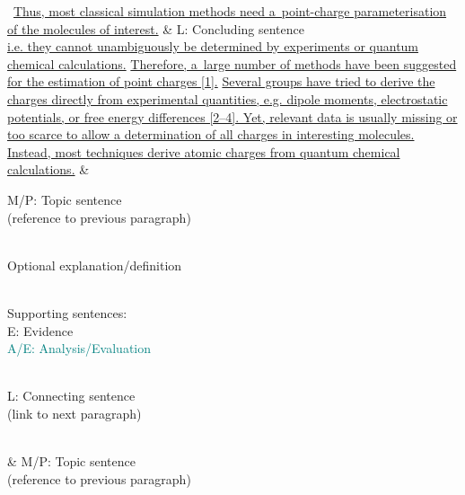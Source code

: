 \begingroup
	\begin{longtblr}{}
		\textellipsis\ {\ul{Thus, most classical simulation methods need a~point-charge parameterisation of the molecules of interest.}}
		&
		\textcolor{DarkOrchid3}{L: Concluding sentence}
		\\
		{\ul{i.e. they cannot unambiguously be determined by experiments or quantum chemical calculations.}}
		{\ul{Therefore, a~large number of methods have been suggested for the estimation of point charges [1].}}
		{\ul{Several groups have tried to derive the charges directly from experimental quantities, e.g. dipole moments, electrostatic potentials, or free energy differences [2--4]. Yet, relevant data is usually missing or too scarce to allow a determination of all charges in interesting molecules.}}
		{\ul{Instead, most techniques derive atomic charges from quantum chemical calculations.}}%
		&
		{%
			\textcolor{Purple4}{M/P: Topic sentence} \\
			\textcolor{Purple4}{\textmd{(reference to previous paragraph)}} \\
			\strut \\
			\textcolor{RoyalBlue4}{Optional explanation/definition} \\
			\strut \\
			Supporting sentences: \\
			\textcolor{DeepPink4}{E: Evidence} \\
			\textcolor{Teal}{A/E: Analysis/Evaluation} \\
			\strut \\
			\textcolor{DarkOrchid3}{L: Connecting sentence} \\
			\textcolor{DarkOrchid3}{\textmd{(link to next paragraph)}}%
		}
		\\
		 \textellipsis
		&
		{%
			\textcolor{Purple4}{M/P: Topic sentence} \\
			\textcolor{Purple4}{\textmd{(reference to previous paragraph)}}%
		}
\end{longtblr}
\endgroup

